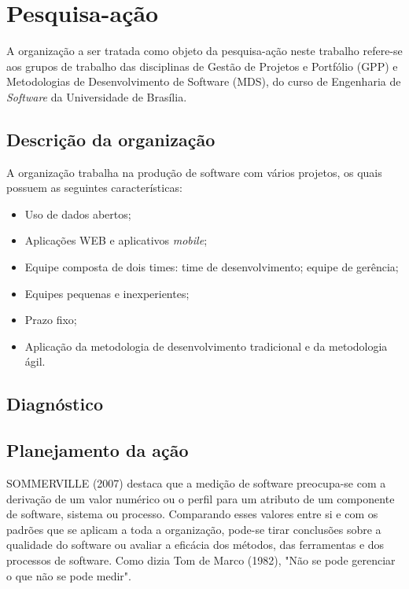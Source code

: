 \chapter{Pesquisa-ação}
\label{pesquisa_acao}

		A organização a ser tratada como objeto da pesquisa-ação neste trabalho refere-se aos grupos de trabalho das disciplinas de Gestão de Projetos
		e Portfólio (GPP) e Metodologias de Desenvolvimento de Software (MDS), do curso de Engenharia de \textit{Software}
		da Universidade de Brasília.

		\section{Descrição da organização}

			A organização trabalha na produção de software com vários projetos, os quais possuem as seguintes características:

			\begin{itemize}
				\item Uso de dados abertos;
				\item Aplicações WEB e aplicativos \textit{mobile};
				\item Equipe composta de dois times:
					 time de desenvolvimento;
					 equipe de gerência;
				\item Equipes pequenas e inexperientes;
				\item Prazo fixo;
				\item Aplicação da metodologia de desenvolvimento tradicional e da metodologia ágil.
			\end{itemize}

	\section{Diagnóstico}

	


	\section{Planejamento da ação}

		SOMMERVILLE (2007) destaca que a medição de software preocupa-se com a derivação de um valor numérico ou o perfil para um atributo de um componente de software, sistema ou processo. Comparando esses valores entre si e com os padrões que se aplicam a toda a organização, pode-se tirar conclusões sobre a qualidade do software ou avaliar a eficácia dos métodos, das ferramentas e dos processos de software. Como dizia Tom de Marco (1982), "Não se pode gerenciar o que não se pode medir".

